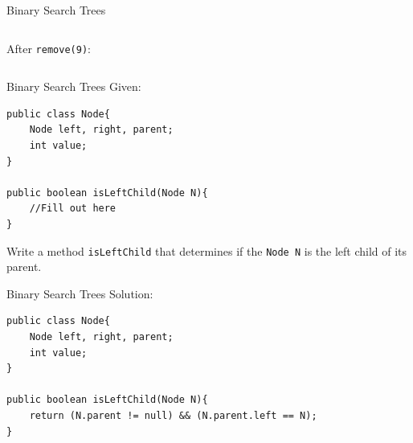 \documentclass[9pt]{beamer}
\begin{document}
\begin{frame}[fragile]{Binary Search Trees}
\begin{columns}
\begin{column}{0.5\textwidth}
{      
      }

      After {\tt remove(9)}:
      \vspace{1em}

       {
      }
    \end{column}
  \end{columns}
\end{frame}

\begin{frame}[fragile]{Binary Search Trees}
Given: \\
 {
  \begin{lstlisting}
public class Node{
    Node left, right, parent;
    int value;
}

public boolean isLeftChild(Node N){
    //Fill out here
}
  \end{lstlisting}
  }
Write a method {\tt isLeftChild} that determines if the {\tt Node N} is the left child of its parent.
\end{frame}

\begin{frame}[fragile]{Binary Search Trees}
Solution: \\
{
\begin{lstlisting}
public class Node{
    Node left, right, parent;
    int value;
}

public boolean isLeftChild(Node N){
    return (N.parent != null) && (N.parent.left == N);
}
  \end{lstlisting}
  }
\end{frame}
\end{document}
